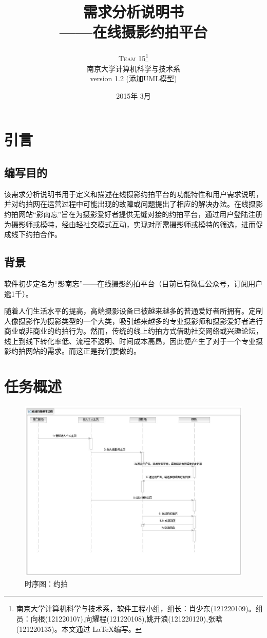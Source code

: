 \documentclass[a4paper,14pt]{ctexart}
\title{\vspace{-15mm}\fontsize{24pt}{10pt}\selectfont\textbf{需求分析说明书}\protect\\ \vspace{5mm} \Large ——在线摄影约拍平台}
\author{
\large
\textsc{Team 15}\thanks{南京大学计算机科学与技术系，软件工程小组，组长：肖少东(121220109)。组员：向根(121220107),向耀程(121220108),姚开浪(121220120),张晗(121220135)。本文通过 \LaTeX 编写。}\\[2mm] 
\normalsize 南京大学计算机科学与技术系 \\
\normalsize version 1.2 (添加UML模型)
}
\date{2015年 3月}
\begin{document}
\maketitle 

\tableofcontents

\thispagestyle{fancy}


\newpage
\section{引言}

\subsection{编写目的}
 该需求分析说明书用于定义和描述在线摄影约拍平台的功能特性和用户需求说明，并对约拍网在运营过程中可能出现的故障或问题提出了相应的解决办法。在线摄影约拍网站“影南忘”旨在为摄影爱好者提供无缝对接的约拍平台，通过用户登陆注册为摄影师或模特，经由轻社交模式互动，实现对所需摄影师或模特的筛选，进而促成线下约拍合作。
\subsection{背景}
软件初步定名为“影南忘”——在线摄影约拍平台（目前已有微信公众号，订阅用户逾1千）。\par

随着人们生活水平的提高，高端摄影设备已被越来越多的普通爱好者所拥有。定制人像摄影作为摄影类型的一个大类，吸引越来越多的专业摄影师和摄影爱好者进行商业或非商业的约拍行为。然而，传统的线上约拍方式借助社交网络或兴趣论坛，线上到线下转化率低、流程不透明、时间成本高昂，因此便产生了对于一个专业摄影约拍网站的需求。而这正是我们要做的。




\section{任务概述}
\begin{figure}[H]
\centering\includegraphics[width=4.5in]{时序图-约拍.jpeg}
\caption{时序图：约拍}
\label{fig:13}
\end{figure}
\end{document}
